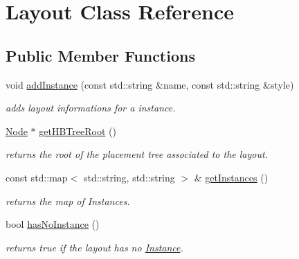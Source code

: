 \hypertarget{class_open_chams_1_1_layout}{}\section{Layout Class Reference}
\label{class_open_chams_1_1_layout}
\subsection*{Public Member Functions}
\begin{DoxyCompactItemize}
\item 
void \hyperlink{class_open_chams_1_1_layout_a4cc1899e9b782de44700fa0e4ac477ef}{add\+Instance} (const std\+::string \&name, const std\+::string \&style)
\begin{DoxyCompactList}\small\item\em adds layout informations for a instance. \end{DoxyCompactList}\item 
\mbox{\label{class_open_chams_1_1_layout_a13df4992219ef28a7dc014e9f5f0566a}} 
\hyperlink{class_open_chams_1_1_node}{Node} $\ast$ \hyperlink{class_open_chams_1_1_layout_a13df4992219ef28a7dc014e9f5f0566a}{get\+H\+B\+Tree\+Root} ()
\begin{DoxyCompactList}\small\item\em returns the root of the placement tree associated to the layout. \end{DoxyCompactList}\item 
\mbox{\label{class_open_chams_1_1_layout_ab0550a9050b7e788b2a18452c9df21f7}} 
const std\+::map$<$ std\+::string, std\+::string $>$ \& \hyperlink{class_open_chams_1_1_layout_ab0550a9050b7e788b2a18452c9df21f7}{get\+Instances} ()
\begin{DoxyCompactList}\small\item\em returns the map of Instances. \end{DoxyCompactList}\item 
\mbox{\label{class_open_chams_1_1_layout_af27a31f10fcf22daa64f35c9c6bd2cda}} 
bool \hyperlink{class_open_chams_1_1_layout_af27a31f10fcf22daa64f35c9c6bd2cda}{has\+No\+Instance} ()
\begin{DoxyCompactList}\small\item\em returns true if the layout has no \hyperlink{class_open_chams_1_1_instance}{Instance}. \end{DoxyCompactList}\item 

\end{DoxyCompactItemize}
